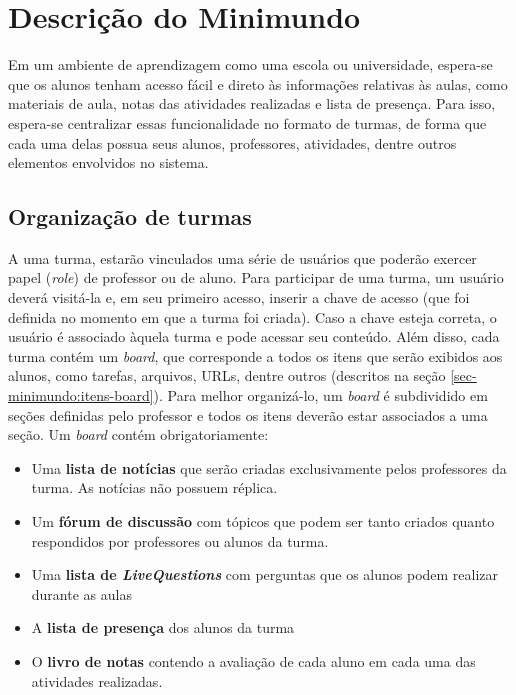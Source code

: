 
\chapter{Descrição do Minimundo}
\label{sec-minimundo}

Em um ambiente de aprendizagem como uma escola ou universidade, espera-se que os alunos tenham acesso fácil e direto às informações relativas às aulas, como materiais de aula, notas das atividades realizadas e lista de presença. Para isso, espera-se centralizar essas funcionalidade no formato de turmas, de forma que cada uma delas possua seus alunos, professores, atividades, dentre outros elementos envolvidos no sistema.

\section{Organização de turmas}
\label{sec-minimundo:organizacao-turmas}

A uma turma, estarão vinculados uma série de usuários que poderão exercer papel (\textit{role}) de professor ou de aluno. Para participar de uma turma, um usuário deverá visitá-la e, em seu primeiro acesso, inserir a chave de acesso (que foi definida no momento em que a turma foi criada). Caso a chave esteja correta, o usuário é associado àquela turma e pode acessar seu conteúdo. Além disso, cada turma contém um \textit{board}, que corresponde a todos os itens que serão exibidos aos alunos, como tarefas, arquivos, URLs, dentre outros (descritos na seção \ref{sec-minimundo:itens-board}). Para melhor organizá-lo, um \textit{board} é subdividido em seções definidas pelo professor e todos os itens deverão estar associados a uma seção. Um \textit{board} contém obrigatoriamente:

\begin{itemize}
	\item Uma \textbf{lista de notícias} que serão criadas exclusivamente pelos professores da turma. As notícias não possuem réplica.
	\item Um \textbf{fórum de discussão} com tópicos que podem ser tanto criados quanto respondidos por professores ou alunos da turma.
	\item Uma \textbf{lista de \textit{LiveQuestions}} com perguntas que os alunos podem realizar durante as aulas
	\item A \textbf{lista de presença} dos alunos da turma
	\item O \textbf{livro de notas} contendo a avaliação de cada aluno em cada uma das atividades realizadas.
\end{itemize}

